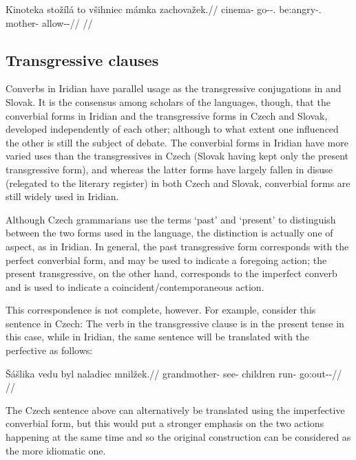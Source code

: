 \pex
\begingl
\gla Kinoteka stožílá to všihniec mámka zachovažek.//
\glb cinema-\Acc{} go-\Av{}-\Sbj{}.\Ipf{} \Rz{} be:angry-\Cv{}.\Ipf{} mother-\Dim{} allow-\Av{}-\Pf{}//
\glft {}//
\endgl
\xe


\subsection{Transgressive clauses}

Converbs in Iridian have parallel usage as the transgressive conjugations in  and Slovak. It is the consensus among scholars of the languages, though, that the converbial forms in Iridian and the transgressive forms in Czech and Slovak, developed independently of each other; although to what extent one influenced the other is still the subject of debate. The converbial forms in Iridian have more varied uses than the transgressives in Czech (Slovak having kept only the present transgressive form), and whereas the latter forms have largely fallen in disuse (relegated to the literary register) in both Czech and Slovak, converbial forms are still widely used in Iridian.

Although Czech grammarians use the terms `past' and `present' to distinguish between the two forms used in the language, the distinction is actually one of aspect, as in Iridian. In general, the past transgressive form corresponds with the perfect converbial form, and may be used to indicate a foregoing action; the present transgressive, on the other hand, corresponds to the imperfect converb and is used to indicate a coincident/contemporaneous action.

This correspondence is not complete, however. For example, consider this sentence in Czech:  The verb in the transgressive clause is in the present tense in this case, while in Iridian, the same sentence will be translated with the perfective as follows:

\pex
\begingl
\gla \v{S}ášlika vedu byl naladiec mnilžek.//
\glb grandmother- see- children run- go:out-\Av{}-\Pf{}//
\glft {}//
\endgl
\xe

The Czech sentence above can alternatively be translated using the imperfective converbial form, but this would put a stronger emphasis on the two actions happening at the same time and so the original construction can be considered as the more idiomatic one.

